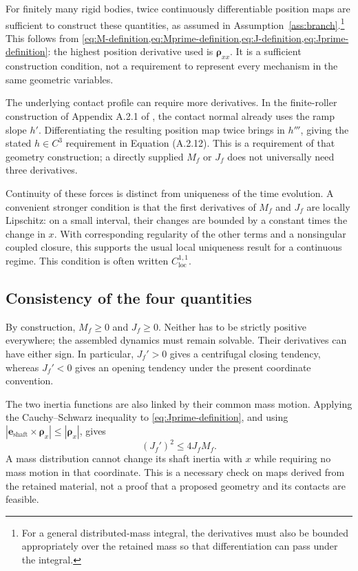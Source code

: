 \documentclass[11pt,letterpaper]{article}
\numberwithin{equation}{section}
\newcommand{\e}{\bm e_{\mathrm{shaft}}}
\newcommand{\rhoo}{\bm\rho}
\newcommand{\source}{\cite{formulation}}
\begin{document}
For finitely many rigid bodies, twice continuously differentiable position maps are sufficient to construct these quantities, as assumed in Assumption~\ref{ass:branch}.\footnote{For a general distributed-mass integral, the derivatives must also be bounded appropriately over the retained mass so that differentiation can pass under the integral.} This follows from \cref{eq:M-definition,eq:Mprime-definition,eq:J-definition,eq:Jprime-definition}: the highest position derivative used is $\rhoo_{xx}$. It is a sufficient construction condition, not a requirement to represent every mechanism in the same geometric variables.

The underlying contact profile can require more derivatives. In the finite-roller construction of Appendix A.2.1 of \source{}, the contact normal already uses the ramp slope $h'$. Differentiating the resulting position map twice brings in $h'''$, giving the stated $h\in C^3$ requirement in Equation (A.2.12). This is a requirement of that geometry construction; a directly supplied $M_f$ or $J_f$ does not universally need three derivatives.

Continuity of these forces is distinct from uniqueness of the time evolution. A convenient stronger condition is that the first derivatives of $M_f$ and $J_f$ are locally Lipschitz: on a small interval, their changes are bounded by a constant times the change in $x$. With corresponding regularity of the other terms and a nonsingular coupled closure, this supports the usual local uniqueness result for a continuous regime. This condition is often written $C^{1,1}_{\mathrm{loc}}$.

\subsection{Consistency of the four quantities}

By construction, $M_f\ge0$ and $J_f\ge0$. Neither has to be strictly positive everywhere; the assembled dynamics must remain solvable. Their derivatives can have either sign. In particular, $J_f'>0$ gives a centrifugal closing tendency, whereas $J_f'<0$ gives an opening tendency under the present coordinate convention.

The two inertia functions are also linked by their common mass motion. Applying the Cauchy--Schwarz inequality to \cref{eq:Jprime-definition}, and using $|\e\times\rhoo_x|\le|\rhoo_x|$, gives
\begin{equation}
  (J_f')^2\le4J_fM_f.
  \label{eq:map-consistency}
\end{equation}
A mass distribution cannot change its shaft inertia with $x$ while requiring no mass motion in that coordinate. This is a necessary check on maps derived from the retained material, not a proof that a proposed geometry and its contacts are feasible.
\end{document}
